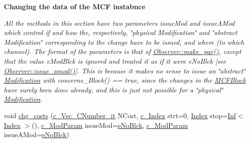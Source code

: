 \begin{Indent}\textbf{ Changing the data of the M\+CF instabnce}\par
{\em All the methods in this section have two parameters issue\+Mod and issue\+A\+Mod which control if and how the, respectively, \char`\"{}physical Modification\char`\"{} and \char`\"{}abstract Modification\char`\"{} corresponding to the change have to be issued, and where (to which channel). The format of the parameters is that of \mbox{\hyperlink{class_s_m_spp__di__unipi__it_1_1_observer_a2d499ae38e5e95cf66cd71da32b0694a}{Observer\+::make\+\_\+par()}}, except that the value e\+Mod\+Blck is ignored and treated it as if it were e\+No\+Blck \mbox{[}see \mbox{\hyperlink{class_s_m_spp__di__unipi__it_1_1_observer_adbb3f266845b94b3cc19a549c2634f3d}{Observer\+::issue\+\_\+pmod()}}\mbox{]}. This is because it makes no sense to issue an \char`\"{}abstract\char`\"{} \mbox{\hyperlink{class_s_m_spp__di__unipi__it_1_1_modification}{Modification}} with concerns\+\_\+\+Block() == true, since the changes in the \mbox{\hyperlink{class_s_m_spp__di__unipi__it_1_1_m_c_f_block}{M\+C\+F\+Block}} have surely been done already, and this is just not possible for a \char`\"{}physical\char`\"{} \mbox{\hyperlink{class_s_m_spp__di__unipi__it_1_1_modification}{Modification}}. }\begin{DoxyCompactItemize}
\item 
void \mbox{\hyperlink{class_s_m_spp__di__unipi__it_1_1_m_c_f_block_a41c883dcdfab5eef37487ea9970cd9ee}{chg\+\_\+costs}} (\mbox{\hyperlink{class_s_m_spp__di__unipi__it_1_1_m_c_f_block_aa2211b659beb942cfb7618c11033831e}{c\+\_\+\+Vec\+\_\+\+C\+Number\+\_\+it}} N\+Cost, \mbox{\hyperlink{class_s_m_spp__di__unipi__it_1_1_m_c_f_block_aee6156e2ce80720d57a082d80f39d8cc}{c\+\_\+\+Index}} strt=0, \mbox{\hyperlink{class_s_m_spp__di__unipi__it_1_1_m_c_f_block_ad53d6229d7ec28555a9c9c2fd9abf773}{Index}} stop=\mbox{\hyperlink{class_s_m_spp__di__unipi__it_1_1_inf}{Inf}}$<$ \mbox{\hyperlink{class_s_m_spp__di__unipi__it_1_1_m_c_f_block_ad53d6229d7ec28555a9c9c2fd9abf773}{Index}} $>$(), \mbox{\hyperlink{group___modification___t_y_p_e_s_ga544246d8c462e9a2d817c2c30797968f}{c\+\_\+\+Mod\+Param}} issue\+Mod=\mbox{\hyperlink{group___modification___t_y_p_e_s_gga48fddcdd03a03f49b7e389ca1ed938d4ada69e89c5f46e563d8a13cfa6830c136}{e\+No\+Blck}}, \mbox{\hyperlink{group___modification___t_y_p_e_s_ga544246d8c462e9a2d817c2c30797968f}{c\+\_\+\+Mod\+Param}} issue\+A\+Mod=\mbox{\hyperlink{group___modification___t_y_p_e_s_gga48fddcdd03a03f49b7e389ca1ed938d4ada69e89c5f46e563d8a13cfa6830c136}{e\+No\+Blck}})

\end{DoxyCompactItemize}
\end{Indent}
